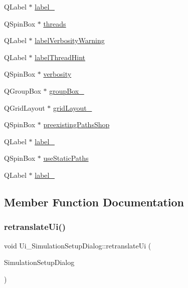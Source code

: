 \begin{DoxyCompactItemize}
\item 
Q\+Label $\ast$ \mbox{\hyperlink{class_ui___simulation_setup_dialog_a3d1062382358065a051f83460cb2ee73}{label\+\_}}
\item 
Q\+Spin\+Box $\ast$ \mbox{\hyperlink{class_ui___simulation_setup_dialog_a81bbf997b41b21fb57730821c1662fb5}{threads}}
\item 
Q\+Label $\ast$ \mbox{\hyperlink{class_ui___simulation_setup_dialog_a7138c81ffbc564c3a4a75a1cace10a20}{label\+Verbosity\+Warning}}
\item 
Q\+Label $\ast$ \mbox{\hyperlink{class_ui___simulation_setup_dialog_acdcfe8db678bf6bc12c82122db51a66e}{label\+Thread\+Hint}}
\item 
Q\+Spin\+Box $\ast$ \mbox{\hyperlink{class_ui___simulation_setup_dialog_af33db8f3322bda9f9d25dc36c75afdf9}{verbosity}}
\item 
Q\+Group\+Box $\ast$ \mbox{\hyperlink{class_ui___simulation_setup_dialog_a9b0c9b05cbe6b342ce5b35e8a2f6c847}{group\+Box\+\_}}
\item 
Q\+Grid\+Layout $\ast$ \mbox{\hyperlink{class_ui___simulation_setup_dialog_a8103d2a66009ef5c19026f6f0e0bba82}{grid\+Layout\+\_}}
\item 
Q\+Spin\+Box $\ast$ \mbox{\hyperlink{class_ui___simulation_setup_dialog_a0b77868247b51d7395faf83f46b740b5}{preexisting\+Paths\+Shop}}
\item 
Q\+Label $\ast$ \mbox{\hyperlink{class_ui___simulation_setup_dialog_a66df4e2a6d411fe2f07ec2016c70ab18}{label\+\_}}
\item 
Q\+Spin\+Box $\ast$ \mbox{\hyperlink{class_ui___simulation_setup_dialog_a5e5300c62cd1587a4f2bf1cec678e48c}{use\+Static\+Paths}}
\item 
Q\+Label $\ast$ \mbox{\hyperlink{class_ui___simulation_setup_dialog_afb85fe34c30b42c64c9757076efcea3a}{label\+\_}}
\end{DoxyCompactItemize}


\subsection{Member Function Documentation}
\mbox{\label{class_ui___simulation_setup_dialog_a206b89b3c7f9bd62cb227f8e40c76031}} 
\subsubsection{\texorpdfstring{retranslateUi()}{retranslateUi()}}
{\footnotesize\ttfamily void Ui\+\_\+\+Simulation\+Setup\+Dialog\+::retranslate\+Ui (\begin{DoxyParamCaption}\item[{Q\+Dialog $\ast$}]{Simulation\+Setup\+Dialog }\end{DoxyParamCaption})\hspace{0.3cm}{\ttfamily [inline]}}

